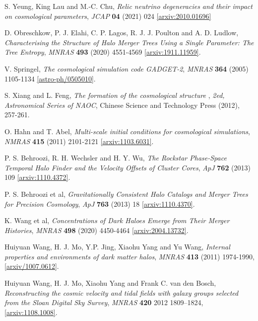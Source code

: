 \documentclass[a4paper,11pt]{article}
\begin{document}
\begin{thebibliography}{99}
 S. Yeung, King Lau and M.-C. Chu, \emph{Relic neutrino degeneracies and their impact on cosmological parameters}, \emph{JCAP} {\bf04} (2021) 024 \href{https://arxiv.org/abs/2010.01696}{[arxiv:2010.01696]}

 D. Obreschkow, P. J. Elahi, C. P. Lagos, R. J. J. Poulton and A. D. Ludlow, \emph{Characterising the Structure of Halo Merger Trees Using a Single Parameter: The Tree Entropy}, \emph{MNRAS} {\bf 493} (2020) 4551-4569 \href{https://arxiv.org/abs/1911.11959}{ [arxiv:1911.11959]}.

 V. Springel, \emph{The cosmological simulation code GADGET-2}, \emph{MNRAS} {\bf 364} (2005) 1105-1134
\href{https://arxiv.org/abs/astro-ph/0505010}{ [astro-ph/0505010]}.

S. Xiang and L. Feng, \emph{The formation of the cosmological structure}
, \emph{2ed, Astronomical Series
of NAOC}, Chinese Science and Technology Press (2012), 257-261.


 O. Hahn and T. Abel, \emph{Multi-scale initial conditions for cosmological simulations}, \emph{NMRAS} {\bf415} (2011) 2101-2121 \href{https://arxiv.org/abs/1103.6031}{ [arxiv:1103.6031]}.


 P. S. Behroozi, R. H. Wechsler and H. Y. Wu, \emph{The Rockstar Phase-Space Temporal Halo Finder and the Velocity Offsets of Cluster Cores}, \emph{ApJ} {\bf762} (2013) 109 \href{https://arxiv.org/abs/1110.4372}{ [arxiv:1110.4372]}.

 P. S. Behroozi et al, \emph{Gravitationally Consistent Halo Catalogs and Merger Trees for Precision Cosmology}, \emph{ApJ} {\bf 763} (2013) 18 \href{https://arxiv.org/abs/1110.4370}{[arxiv:1110.4370]}.

 K. Wang et al, \emph{Concentrations of Dark Haloes Emerge from Their Merger Histories}, \emph{MNRAS} {\bf 498} (2020) 4450-4464 \href{https://arxiv.org/abs/2004.13732}{ [arxiv:2004.13732]}.




Huiyuan Wang, H. J. Mo, Y.P. Jing, Xiaohu Yang and Yu Wang, \emph{Internal properties and environments of dark matter halos}, \emph{MNRAS} {\bf 413} (2011) 1974-1990, \href{https://arxiv.org/abs/1007.0612}{[arxiv/1007.0612]}.


 Huiyuan Wang, H. J. Mo, Xiaohu Yang and Frank C. van den Bosch, \emph{Reconstructing the cosmic velocity and tidal fields with galaxy groups selected from the Sloan Digital Sky Survey}, \emph{MNRAS} {\bf 420} 2012 1809–1824, \href{https://arxiv.org/abs/1108.1008}{[arxiv:1108.1008]}.


\end{thebibliography}
\end{document}

